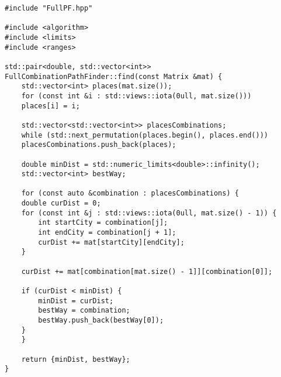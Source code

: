 \begin{lstlisting}[caption={Реализация алгоритма полного перебора},label=lst:full]
#include "FullPF.hpp"

#include <algorithm>
#include <limits>
#include <ranges>

std::pair<double, std::vector<int>>
FullCombinationPathFinder::find(const Matrix &mat) {
    std::vector<int> places(mat.size());
    for (const int &i : std::views::iota(0ull, mat.size()))
    places[i] = i;

    std::vector<std::vector<int>> placesCombinations;
    while (std::next_permutation(places.begin(), places.end()))
    placesCombinations.push_back(places);

    double minDist = std::numeric_limits<double>::infinity();
    std::vector<int> bestWay;

    for (const auto &combination : placesCombinations) {
    double curDist = 0;
    for (const int &j : std::views::iota(0ull, mat.size() - 1)) {
        int startCity = combination[j];
        int endCity = combination[j + 1];
        curDist += mat[startCity][endCity];
    }

    curDist += mat[combination[mat.size() - 1]][combination[0]];

    if (curDist < minDist) {
        minDist = curDist;
        bestWay = combination;
        bestWay.push_back(bestWay[0]);
    }
    }

    return {minDist, bestWay};
}
\end{lstlisting}

